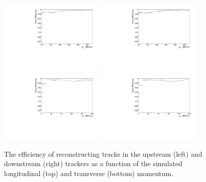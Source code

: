   \begin{figure}[p]
    \centering
    \includegraphics[width=0.45\textwidth, angle=0]{08-Performance/upstream_pz_track_efficiency.pdf}
    \includegraphics[width=0.45\textwidth, angle=0]{08-Performance/downstream_pz_track_efficiency.pdf}\\
    \includegraphics[width=0.45\textwidth, angle=0]{08-Performance/upstream_pt_track_efficiency.pdf}
    \includegraphics[width=0.45\textwidth, angle=0]{08-Performance/downstream_pt_track_efficiency.pdf}
    \caption{\label{fig:track_efficiency} The efficiency of reconstructing tracks in the upstream (left) and downstream (right) trackers as a function of the simulated longitudinal (top) and transverse (bottom) momentum.}
  \end{figure}

